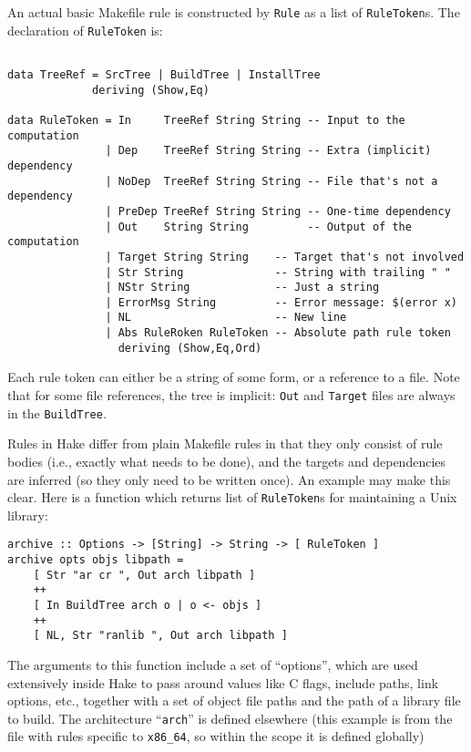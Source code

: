 \documentclass[a4paper,twoside]{report} %
\begin{document}
An actual basic Makefile rule is constructed by \texttt{Rule} as a
list of \texttt{RuleToken}s.  The declaration of \texttt{RuleToken}
is:
\begin{verbatim}

data TreeRef = SrcTree | BuildTree | InstallTree
             deriving (Show,Eq)

data RuleToken = In     TreeRef String String -- Input to the computation
               | Dep    TreeRef String String -- Extra (implicit) dependency
               | NoDep  TreeRef String String -- File that's not a dependency
               | PreDep TreeRef String String -- One-time dependency
               | Out    String String         -- Output of the computation
               | Target String String    -- Target that's not involved
               | Str String              -- String with trailing " "
               | NStr String             -- Just a string
               | ErrorMsg String         -- Error message: $(error x)
               | NL                      -- New line
               | Abs RuleRoken RuleToken -- Absolute path rule token
                 deriving (Show,Eq,Ord)
\end{verbatim}
Each rule token can either be a string of some form, or a reference to
a file.   Note that for some file references, the tree is implicit:
\texttt{Out} and \texttt{Target} files are always in the
\texttt{BuildTree}.

Rules in Hake differ from plain Makefile rules in that
they only consist of rule bodies (i.e., exactly what needs to be
done), and the targets and dependencies are inferred (so they only
need to be written once).  An example may make this clear.  Here is a
function which returns list of \texttt{RuleToken}s for maintaining a
Unix library:
\begin{verbatim}
archive :: Options -> [String] -> String -> [ RuleToken ]
archive opts objs libpath =
    [ Str "ar cr ", Out arch libpath ]
    ++
    [ In BuildTree arch o | o <- objs ]
    ++
    [ NL, Str "ranlib ", Out arch libpath ]
\end{verbatim}
The arguments to this function include a set of ``options'', which are
used extensively inside Hake to pass around values like C flags,
include paths, link options, etc., together with a set of object file
paths and the path of a library file to build.  The architecture
``\texttt{arch}'' is defined elsewhere (this example is from the file
with rules specific to \texttt{x86\_64}, so within the scope it is
defined globally)
\end{document}
